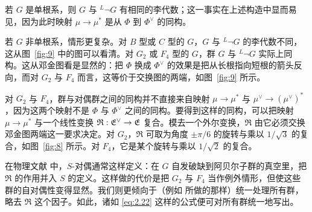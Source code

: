 \bigskip{}

若 $G$ 是单根系，则 $G$ 与 $^L\neg G$ 有相同的李代数；这一事实在上述构造中显而易见，因为此时映射 $\mu\to\mu^*$ 是从 $\Phi$ 到 $\Phi^\vee$ 的同构。

若 $G$ 非单根系，情形更复杂。对 $ {B}$ 型或 $ {C}$ 型的 $G$，$G$ 与 $^L\neg G$ 的李代数不同，这从图~\ref{fig:9} 中的图可以看清。对 $ {G}_2$ 或 $ {F}_4$ 型的 $G$，群 $G$ 与 $^L\neg G$ 实际上同构。这从邓金图看是显然的：把 $\Phi$ 换成 $\Phi^\vee$ 的效果是把从长根指向短根的箭头反向，而对 $G_2$ 与 $F_4$ 而言，这等价于交换图的两端，如图~\ref{fig:9} 所示。

对 $G_2$ 与 $F_4$，群与对偶群之间的同构并不直接来自映射 $\mu\to\mu^*$ 与 $\mu^\vee\to (\mu^\vee)^*$，因为这两个映射不是 $\Phi$ 与 $\Phi^\vee$ 之间的同构。要得到这样的同构，可以把映射 $\mu\to\mu^*$ 与一个线性变换 ${\mathfrak R}:\mathfrak{E}^\vee\to\mathfrak{E}$ 复合。模去一个外尔变换，${\mathfrak R}$ 由它必须交换邓金图两端这一要求决定。对 $ {G}_2$，${\mathfrak R}$ 可取为角度 $\pm \pi/6$ 的旋转与乘以 $1/\sqrt 3$ 的复合，如图~\ref{fig:8} 所示。对 $ {F}_4$，它是某个旋转与乘以 $1/\sqrt 2$ 的复合。

在物理文献 \cite{ref41,ref42} 中，$S$-对偶通常这样定义：在 $G$ 自发破缺到阿贝尔子群的真空里，把 ${\mathfrak R}$ 的作用并入 $S$ 的定义。这样做的代价是把 $G_2$ 与 $F_4$ 当作例外情形，但使这些群的自对偶性变得显然。我们则更倾向于（例如 \cite{ref71} 所做的那样）统一处理所有群，略去 ${\mathfrak R}$ 这个因子。如此，诸如 \eqref{eq:2.22} 这样的公式便可对所有群统一地写出。

